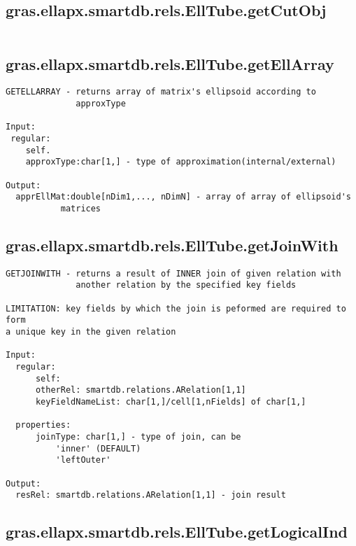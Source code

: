\subsection{\texorpdfstring{gras.ellapx.smartdb.rels.EllTube.getCutObj}{getCutObj}}\label{method:gras.ellapx.smartdb.rels.EllTube.getCutObj}
\begin{verbatim}

\end{verbatim}
\subsection{\texorpdfstring{gras.ellapx.smartdb.rels.EllTube.getEllArray}{getEllArray}}\label{method:gras.ellapx.smartdb.rels.EllTube.getEllArray}
\begin{verbatim}
GETELLARRAY - returns array of matrix's ellipsoid according to
              approxType

Input:
 regular:
    self.
    approxType:char[1,] - type of approximation(internal/external)

Output:
  apprEllMat:double[nDim1,..., nDimN] - array of array of ellipsoid's
           matrices
\end{verbatim}
\subsection{\texorpdfstring{gras.ellapx.smartdb.rels.EllTube.getJoinWith}{getJoinWith}}\label{method:gras.ellapx.smartdb.rels.EllTube.getJoinWith}
\begin{verbatim}
GETJOINWITH - returns a result of INNER join of given relation with
              another relation by the specified key fields

LIMITATION: key fields by which the join is peformed are required to form
a unique key in the given relation

Input:
  regular:
      self:
      otherRel: smartdb.relations.ARelation[1,1]
      keyFieldNameList: char[1,]/cell[1,nFields] of char[1,]

  properties:
      joinType: char[1,] - type of join, can be
          'inner' (DEFAULT)
          'leftOuter'

Output:
  resRel: smartdb.relations.ARelation[1,1] - join result
\end{verbatim}
\subsection{\texorpdfstring{gras.ellapx.smartdb.rels.EllTube.getLogicalInd}{getLogicalInd}}\label{method:gras.ellapx.smartdb.rels.EllTube.getLogicalInd}
\begin{verbatim}

\end{verbatim}
